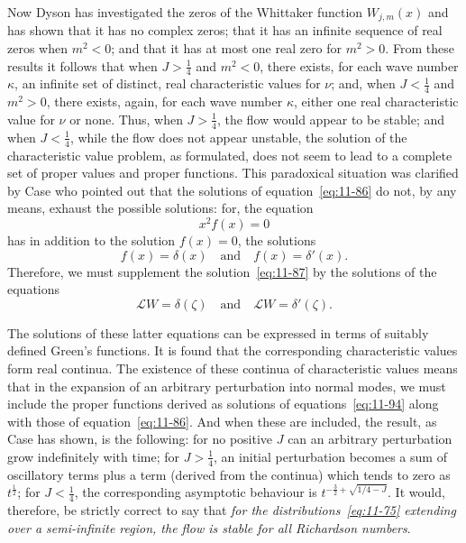 Now Dyson has investigated the zeros of the Whittaker function $W_{j,m}(x)$ and has shown that it has no complex zeros; that it has an infinite sequence of real zeros when $m^2 < 0$; and that it has at most one real zero for $m^2 > 0$. From these results it follows that when $J > \frac{1}{4}$ and $m^2 < 0$, there exists, for each wave number $\kappa$, an infinite set of distinct, real characteristic values for $\nu$; and, when $J < \frac{1}{4}$ and $m^2 > 0$, there exists, again, for each wave number $\kappa$, either one real characteristic value for $\nu$ or none. Thus, when $J > \frac{1}{4}$, the flow would appear to be stable; and when $J < \frac{1}{4}$, while the flow does not appear unstable, the solution of the characteristic value problem, as formulated, does not seem to lead to a complete set of proper values and proper functions. This paradoxical situation was clarified by Case who pointed out that the solutions of equation~\eqref{eq:11-86} do not, by any means, exhaust the possible solutions: for, the equation
\begin{equation}
\label{eq:11-92}
x^2 f(x) = 0
\end{equation}
has in addition to the solution $f(x) = 0$, the solutions
\begin{equation}
\label{eq:11-93}
f(x) = \delta(x) \quad\text{and}\quad f(x) = \delta'(x).
\end{equation}
Therefore, we must supplement the solution~\eqref{eq:11-87} by the solutions of the equations
\begin{equation}
\label{eq:11-94}
\mathscr{L}W = \delta(\zeta) \quad\text{and}\quad \mathscr{L}W = \delta'(\zeta).
\end{equation}

The solutions of these latter equations can be expressed in terms of suitably defined Green's functions. It is found that the corresponding characteristic values form real continua. The existence of these continua of characteristic values means that in the expansion of an arbitrary perturbation into normal modes, we must include the proper functions derived as solutions of equations~\eqref{eq:11-94} along with those of equation~\eqref{eq:11-86}. And when these are included, the result, as Case has shown, is the following: for no positive $J$ can an arbitrary perturbation grow indefinitely with time; for $J > \frac{1}{4}$, an initial perturbation becomes a sum of oscillatory terms plus a term (derived from the continua) which tends to zero as $t^{\frac{1}{2}}$; for $J < \frac{1}{4}$, the corresponding asymptotic behaviour is $t^{-\frac{3}{2}+\sqrt{1/4-J}}$. It would, therefore, be strictly correct to say that \textit{for the distributions~\eqref{eq:11-75} extending over a semi-infinite region, the flow is stable for all Richardson numbers}.

